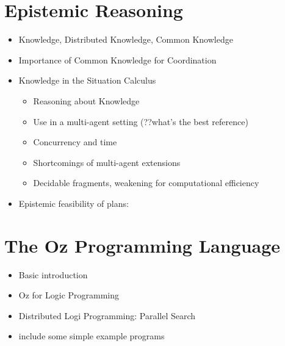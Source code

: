 \section{Epistemic Reasoning}

\begin{itemize}
\item Knowledge, Distributed Knowledge, Common Knowledge \cite{halpern90knowledge_distrib,fagin95}
\item Importance of Common Knowledge for Coordination
\item Knowledge in the Situation Calculus
  \begin{itemize}
  \item Reasoning about Knowledge \cite{moore80know_act,scherl03sc_knowledge}
  \item Use in a multi-agent setting (??what's the best reference)
  \item Concurrency and time \cite{scherl03conc_knowledge}
  \item Shortcomings of multi-agent extensions
  \item Decidable fragments, weakening for computational efficiency
  \end{itemize}
\item Epistemic feasibility of plans: \cite{giacomo04sem_delib_indigolog,Lesperance01epi_feas_casl}
\end{itemize}

\section{The Oz Programming Language}

\begin{itemize}
\item Basic introduction \cite{vanroy99mozart}
\item Oz for Logic Programming \cite{vanroy03mozart_logic}
\item Distributed Logi Programming: Parallel Search \cite{schulte00oz_parallel}
\item include some simple example programs
\end{itemize}

